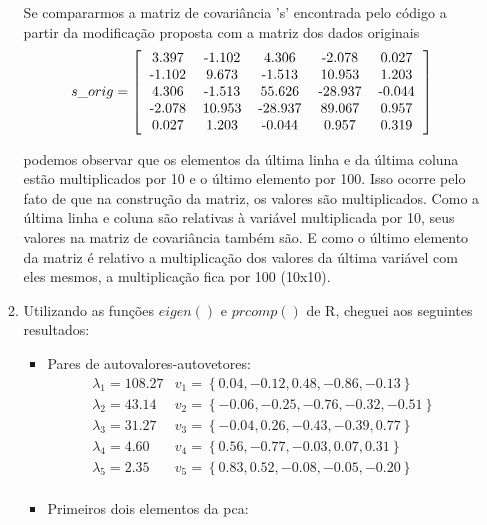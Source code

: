 \documentclass[11pt,a4paper]{book}
\begin{document}
\begin{enumerate}
\begin{enumerate}[label=\alph*)]
				Se compararmos a matriz de covariância 's' encontrada pelo código a partir da modificação proposta com a matriz dos dados originais
				\begin{eqnarray*}
					s\_orig=\left[
					\begin{tabular}{c c c c c}
					3.397 & -1.102 & 4.306 & -2.078 & 0.027\\
					-1.102 & 9.673 & -1.513 & 10.953 & 1.203\\
					4.306 & -1.513 & 55.626 & -28.937 & -0.044\\
					-2.078 & 10.953 & -28.937 & 89.067 & 0.957\\
					0.027 & 1.203 & -0.044 & 0.957 & 0.319
					\end{tabular}
					\right]
				\end{eqnarray*}
				
				podemos observar que os elementos da última linha e da última coluna estão multiplicados por 10 e o último elemento por 100.
				Isso ocorre pelo fato de que na construção da matriz, os valores são multiplicados.
				Como a última linha e coluna são relativas à variável multiplicada por 10, seus valores na matriz de covariância também são.
				E como o último elemento da matriz é relativo a multiplicação dos valores da última variável com eles mesmos, a multiplicação fica por 100 (10x10).
				
				\item
				Utilizando as funções $eigen()$ e $prcomp()$ de R, cheguei aos seguintes resultados:
				
				\begin{itemize}
					\item Pares de autovalores-autovetores:
					\begin{eqnarray*}
						\lambda_1 = 108.27 & v_1=\left\lbrace 0.04,-0.12,0.48,-0.86,-0.13 \right\rbrace\\
						\lambda_2 = 43.14 & v_2=\left\lbrace -0.06,-0.25,-0.76, -0.32,-0.51 \right\rbrace\\
						\lambda_3 = 31.27 & v_3=\left\lbrace -0.04,0.26,-0.43,-0.39,0.77 \right\rbrace\\
						\lambda_4 = 4.60 & v_4=\left\lbrace 0.56,-0.77,-0.03,0.07,0.31 \right\rbrace\\
						\lambda_5 = 2.35 & v_5=\left\lbrace 0.83,0.52,-0.08,-0.05,-0.20 \right\rbrace\\
					\end{eqnarray*}
					
					\item Primeiros dois elementos da pca:
					

\end{itemize}
\end{enumerate}
\end{enumerate}
\end{document}
